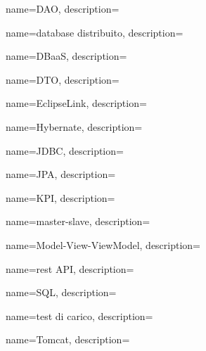 

{
    name=DAO,
    description={}
}

{
    name=database distribuito,
    description={}
}

{
    name=DBaaS,
    description={}
}

{
    name=DTO,
    description={}
}

{
    name=EclipseLink,
    description={}
}


{
    name=Hybernate,
    description={}
}


{
    name=JDBC,
    description={}
}

{
    name=JPA,
    description={}
}

{
    name=KPI,
    description={}
}

{
    name=master-slave,
    description={}
}

{
    name=Model-View-ViewModel,
    description={}
}

{
    name=rest API,
    description={}
}

{
    name=SQL,
    description={}
}

{
    name=test di carico,
    description={}
}

{
    name=Tomcat,
    description={}
}

